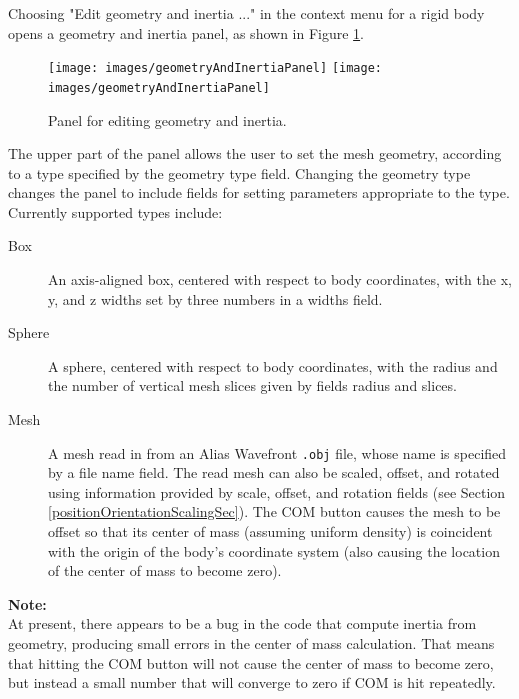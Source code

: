 \documentclass{article}
\begin{document}
Choosing {\sf "Edit geometry and inertia ..."} in the context menu for
a rigid body opens a geometry and inertia panel, as shown in
Figure \ref{geometryAndInertiaPanelFig}.

\begin{figure}
\begin{center}
\iflatexml
\texttt{[image: images/geometryAndInertiaPanel]}
\else
\texttt{[image: images/geometryAndInertiaPanel]}
\fi
\end{center}
\caption{Panel for editing geometry and inertia.}%
\label{geometryAndInertiaPanelFig}
\end{figure}

The upper part of the panel allows the user to set the mesh geometry,
according to a type specified by the {\sf geometry type} field. Changing
the geometry type changes the panel to include fields for setting
parameters appropriate to the type. Currently supported types include:

\begin{description}

\item[Box]\mbox{}

An axis-aligned box, centered with respect to body coordinates, with
the x, y, and z widths set by three numbers in a {\sf widths} field.

\item[Sphere]\mbox{}

A sphere, centered with respect to body coordinates, with
the radius and the number of vertical mesh slices given
by fields {\sf radius} and {\sf slices}.

\item[Mesh]\mbox{}
 A mesh read in from an Alias Wavefront {\tt .obj} file, whose name
is specified by a {\sf file name} field. The read mesh can also be scaled,
offset, and rotated using information provided by {\sf scale}, {\sf offset},
and {\sf rotation} fields (see Section \ref{positionOrientationScalingSec}). 
The {\sf COM}
button causes the mesh to be offset so that its center of mass
(assuming uniform density) is coincident with the origin of the body's
coordinate system (also causing the location of the center of mass to
become zero).

\end{description}

\begin{sideblock}
{\bf Note:}\\ 
At present, there appears to be a bug in the code that compute
inertia from geometry, producing small errors in the center of mass
calculation. That means that hitting the {\sf COM} button will not cause
the center of mass to become zero, but instead a small number that
will converge to zero if {\sf COM} is hit repeatedly.
\end{sideblock}
\end{document}
